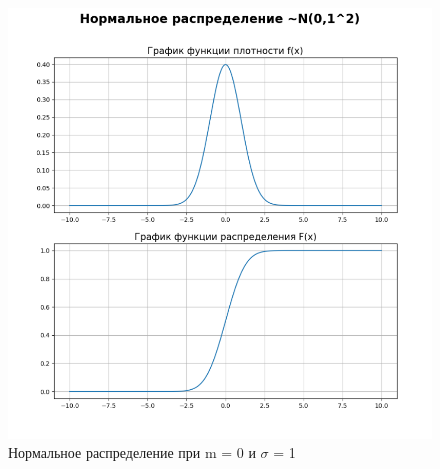 \begin{figure}[ht!]
	\centering
	\includegraphics[width=0.8\linewidth]{img/n1.png}
	\caption{Нормальное распределение при m = 0 и $\sigma$ = 1}
	\label{ex:n1}
\end{figure}

\clearpage
%
%
%
